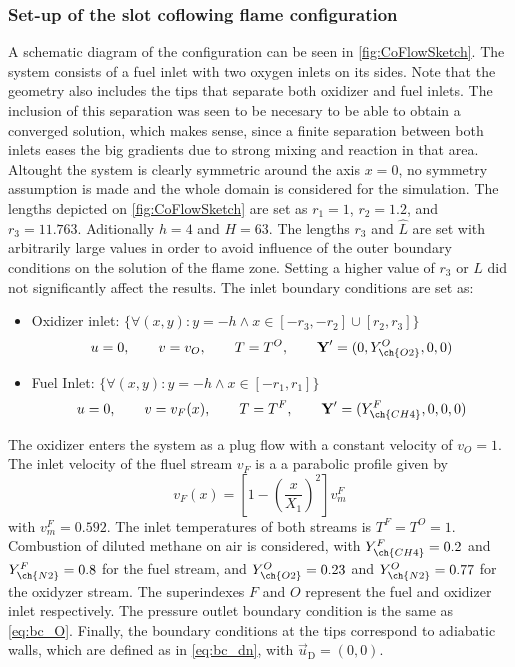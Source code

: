 \subsubsection{Set-up of the slot coflowing flame configuration}
A schematic diagram of the configuration can be seen in \cref{fig:CoFlowSketch}. The system consists of a fuel inlet with two oxygen inlets on its sides. Note that the geometry also includes the tips that separate both oxidizer and fuel inlets. The inclusion of this separation was seen to be necesary to be able to obtain a converged solution, which makes sense, since a finite separation between both inlets eases the big gradients due to strong mixing and reaction in that area. Altought the system is clearly symmetric around the axis $x = 0$, no symmetry assumption is made and the whole domain is considered for the simulation.
The lengths  depicted on \cref{fig:CoFlowSketch} are set as $ r_1 = 1$, $ r_2 = 1.2$, and $ r_3 = 11.763$. Aditionally $ h = 4$ and $ H = 63$. The lengths $ r_3$ and $\hat L$ are set with arbitrarily large values in order to avoid influence of the outer boundary conditions on the solution of the flame zone. Setting a higher value of $ r_3$ or $ L$ did not significantly affect the results. The inlet boundary conditions are set as: 
\begin{itemize}
	\item Oxidizer inlet: $\{\forall (x,y): y = -h \land x \in [-r_3,-r_2]\cup[r_2,r_3]\}$\\
	\begin{equation*}
		u = 0,\qquad v= v_O, \qquad T = T^O, \qquad \vec{Y}' = (0,Y^O_{\ch{O2}},0,0)
	\end{equation*}
\item Fuel Inlet: $\{\forall (x,y): y = -h \land x \in [-r_1,r_1]\} $ \\
\begin{equation*}
	u = 0,\qquad v= v_F(x), \qquad T = T^F, \qquad \vec{Y}' = (Y^F_{\ch{CH4}},0,0,0)
\end{equation*}
\end{itemize}
The oxidizer enters the system as a plug flow with a constant velocity of $v_O = 1 $. The inlet velocity of the fluel stream $v_F$ is a a parabolic profile given by
\begin{equation}
	v_F(x) = \left[1-\left(\frac{x}{X_1}\right)^2\right]v_m^F
\end{equation}
with $v^F_m =0.592$.  The inlet temperatures of both streams is  $T^F = T^O = 1$. Combustion of diluted methane on air is considered, with $Y^F_{\ch{CH4}} = 0.2$ and $Y^F_{\ch{N2}} = 0.8$ for the fuel stream, and  $Y^O_{\ch{O2}} = 0.23$ and $Y^O_{\ch{N2}} = 0.77$ for the oxidyzer stream. The superindexes $F$ and $O$ represent the fuel and oxidizer inlet respectively. The pressure outlet boundary condition is the same as \cref{eq:bc_O}. Finally, the boundary conditions at the tips correspond to adiabatic walls, which are defined as in \cref{eq:bc_dn}, with $\vec{u}_{\text{D}} = (0,0)$.             

